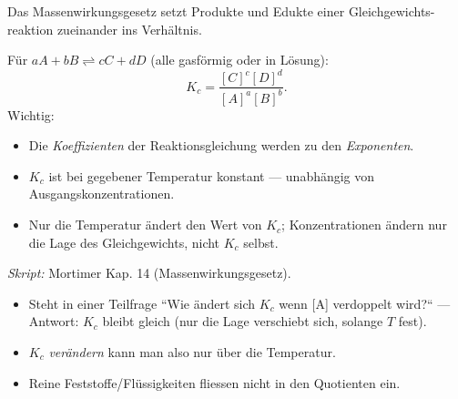 

Das Massenwirkungsgesetz setzt Produkte und Edukte einer Gleichgewichts-
reaktion zueinander ins Verhältnis.

\begin{werkzeugkasten}[Massenwirkungsgesetz]
Für $aA + bB \rightleftharpoons cC + dD$ (alle gasförmig oder in Lösung):
\[
  K_c = \frac{[C]^c [D]^d}{[A]^a [B]^b}.
\]
Wichtig:
\begin{itemize}
  \item Die \emph{Koeffizienten} der Reaktionsgleichung werden zu den
        \emph{Exponenten}.
  \item $K_c$ ist bei gegebener Temperatur konstant --- unabhängig von
        Ausgangskonzentrationen.
  \item Nur die Temperatur ändert den Wert von $K_c$; Konzentrationen
        ändern nur die Lage des Gleichgewichts, nicht $K_c$ selbst.
\end{itemize}
\textit{Skript:} Mortimer Kap. 14 (Massenwirkungsgesetz).
\end{werkzeugkasten}

\begin{achtung}
\begin{itemize}
  \item Steht in einer Teilfrage ``Wie ändert sich $K_c$ wenn [A]
        verdoppelt wird?`` --- Antwort: $K_c$ bleibt gleich (nur die Lage
        verschiebt sich, solange $T$ fest).
  \item $K_c$ \emph{verändern} kann man also nur über die Temperatur.
  \item Reine Feststoffe/Flüssigkeiten fliessen nicht in den Quotienten ein.
\end{itemize}
\end{achtung}
